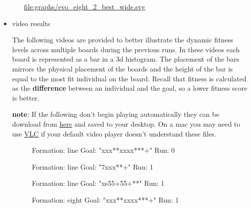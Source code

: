 \documentclass[11pt]{article}
\begin{document}
\begin{itemize}
\begin{itemize}
\href{file:///nfs/adaptive/eschulte/src/gp4ixm-report/graphs/evo_eight_2_best_wide.svg}{file:graphs/evo\_eight\_2\_best\_wide.svg}

\end{itemize} %

\item video results\\
\label{sec-1.5.3.3}

The following videos are provided to better illustrate the dynamic
fitness levels across multiple boards during the previous runs.  In
these videos each board is represented as a bar in a 3d histogram.
The placement of the bars mirrors the physical placement of the boards
and the height of the bar is equal to the most fit individual on the
board.  Recall that fitness is calculated as the \textbf{difference} between
an individual and the goal, so a lower fitness score is better.

\textbf{note}: If the following don't begin playing automatically they can be
download from \href{http://cs.unm.edu/~eschulte/classes/cs591-rpc/gp4ixm-report/videos}{here} and saved to your desktop.  On a mac you may need
to use \href{http://www.videolan.org/vlc/}{VLC} if your default video player doesn't understand these
files.

  \begin{figure}
  \centering
  \caption{Formation: line Goal: "xxx**xxxx***+" Run: 0}
  \end{figure}


  \begin{figure}
  \centering
  \caption{Formation: line Goal: "7xxx**+" Run: 1}
  \end{figure}


  \begin{figure}
  \centering
  \caption{Formation: line Goal: "xs55+55+**" Run: 1}
  \end{figure}


  \begin{figure}
  \centering
  \caption{Formation: eight Goal: "xxx**xxxx***+" Run: 1}
  \end{figure}



\end{itemize}
\end{document}
